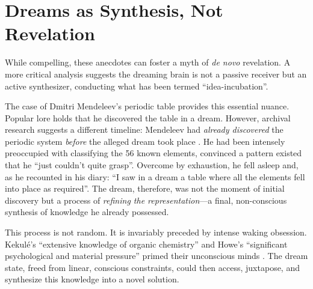 \section{Dreams as Synthesis, Not Revelation}\label{sec:deconstructing}

While compelling, these anecdotes can foster a myth of \textit{de novo} revelation. A more critical analysis suggests the dreaming brain is not a passive receiver but an active synthesizer, conducting what has been termed ``idea-incubation''.

The case of Dmitri Mendeleev's periodic table provides this essential nuance. Popular lore holds that he discovered the table in a dream. However, archival research suggests a different timeline: Mendeleev had \textit{already discovered} the periodic system \textit{before} the alleged dream took place \citep{gordin2004mendeleev}. He had been intensely preoccupied with classifying the 56 known elements, convinced a pattern existed that he ``just couldn't quite grasp''. Overcome by exhaustion, he fell asleep and, as he recounted in his diary: ``I saw in a dream a table where all the elements fell into place as required''. The dream, therefore, was not the moment of initial discovery but a process of \textit{refining the representation}—a final, non-conscious synthesis of knowledge he already possessed.

This process is not random. It is invariably preceded by intense waking obsession. Kekulé's ``extensive knowledge of organic chemistry'' and Howe's ``significant psychological and material pressure'' primed their unconscious minds \citep{findlay1965chemistry, kaempffert1924invention}. The dream state, freed from linear, conscious constraints, could then access, juxtapose, and synthesize this knowledge into a novel solution.

